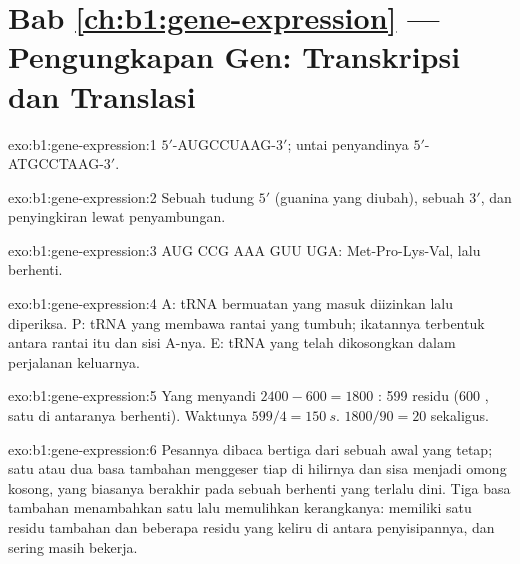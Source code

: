 \section*{Bab \ref{ch:b1:gene-expression} --- Pengungkapan Gen: Transkripsi dan Translasi}

\begin{solution}{exo:b1:gene-expression:1}
 $5'$-AUGCCUAAG-$3'$; untai penyandinya $5'$-ATGCCTAAG-$3'$.
\end{solution}

\begin{solution}{exo:b1:gene-expression:2}
Sebuah tudung $5'$ (guanina yang diubah), sebuah  $3'$, dan
penyingkiran  lewat penyambungan.
\end{solution}

\begin{solution}{exo:b1:gene-expression:3}
AUG CCG AAA GUU UGA: Met-Pro-Lys-Val, lalu berhenti.
\end{solution}

\begin{solution}{exo:b1:gene-expression:4}
A: tRNA bermuatan yang masuk diizinkan lalu diperiksa. P: tRNA yang
membawa rantai yang tumbuh; ikatannya terbentuk antara rantai itu dan
 sisi A-nya. E: tRNA yang telah dikosongkan dalam perjalanan
keluarnya.
\end{solution}

\begin{solution}{exo:b1:gene-expression:5}
Yang menyandi $2400 - 600 = 1800$ : 599 residu (600 ,
satu di antaranya berhenti). Waktunya $599/4 = \qty{150}{s}$. 
$1800/90 = 20$ sekaligus.
\end{solution}

\begin{solution}{exo:b1:gene-expression:6}
Pesannya dibaca bertiga dari sebuah awal yang tetap; satu atau dua basa
tambahan menggeser tiap  di hilirnya dan sisa  menjadi
omong kosong, yang biasanya berakhir pada sebuah berhenti yang terlalu
dini. Tiga basa tambahan menambahkan satu  lalu memulihkan
kerangkanya:  memiliki satu residu tambahan dan beberapa
residu yang keliru di antara penyisipannya, dan sering masih bekerja.
\end{solution}

